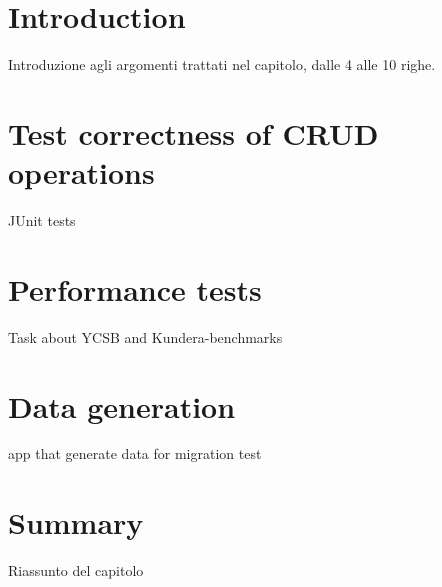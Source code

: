\section{Introduction}
Introduzione agli argomenti trattati nel capitolo, dalle 4 alle 10 righe.

\section{Test correctness of CRUD operations}
JUnit tests

\section{Performance tests}
Task about YCSB and Kundera-benchmarks
 
\section{Data generation}
app that generate data for migration test

\section{Summary}
Riassunto del capitolo
